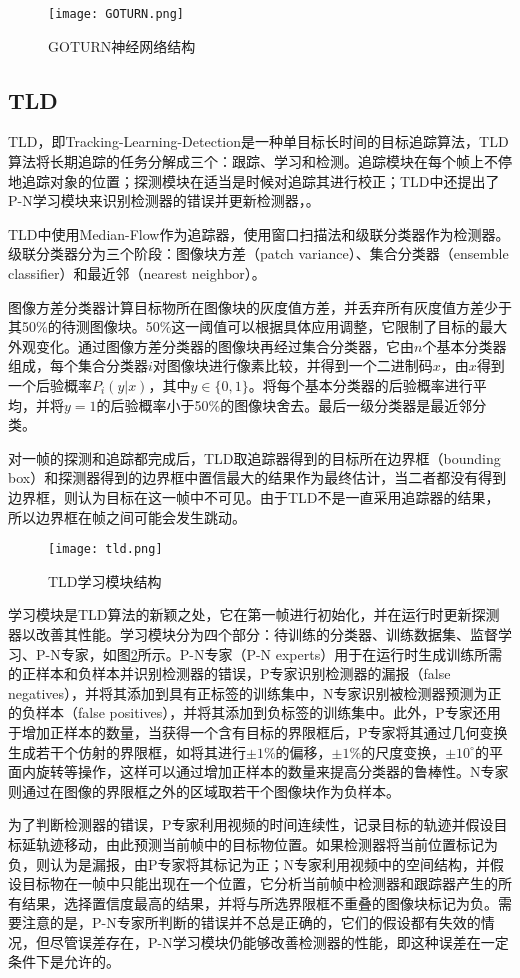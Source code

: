 \begin{figure}[htb]
  \centering
  \texttt{[image: GOTURN.png]}
  \caption{GOTURN神经网络结构}
  \label{fig:GOTURN}
\end{figure}

\subsection{TLD}

  TLD，即Tracking-Learning-Detection是一种单目标长时间的目标追踪算法，TLD算法将长期追踪的任务分解成三个：跟踪、学习和检测。追踪模块在每个帧上不停地追踪对象的位置；探测模块在适当是时候对追踪其进行校正；TLD中还提出了P-N学习模块来识别检测器的错误并更新检测器，\cite{kalal2012tracking}。

  TLD中使用Median-Flow作为追踪器，使用窗口扫描法和级联分类器作为检测器。级联分类器分为三个阶段：图像块方差（patch variance）、集合分类器（ensemble classifier）和最近邻（nearest neighbor）。

  图像方差分类器计算目标物所在图像块的灰度值方差，并丢弃所有灰度值方差少于其50\%的待测图像块。50\%这一阈值可以根据具体应用调整，它限制了目标的最大外观变化。通过图像方差分类器的图像块再经过集合分类器，它由$n$个基本分类器组成，每个集合分类器$i$对图像块进行像素比较，并得到一个二进制码$x$，由$x$得到一个后验概率$P_i(y|x)$，其中$y\in\{0,1\}$。将每个基本分类器的后验概率进行平均，并将$y=1$的后验概率小于50\%的图像块舍去。最后一级分类器是最近邻分类。

  对一帧的探测和追踪都完成后，TLD取追踪器得到的目标所在边界框（bounding box）和探测器得到的边界框中置信最大的结果作为最终估计，当二者都没有得到边界框，则认为目标在这一帧中不可见。由于TLD不是一直采用追踪器的结果，所以边界框在帧之间可能会发生跳动。

\begin{figure}[htb]
  \centering
  \texttt{[image: tld.png]}
  \caption{TLD学习模块结构}
  \label{fig:tldlearning}
\end{figure}

  学习模块是TLD算法的新颖之处，它在第一帧进行初始化，并在运行时更新探测器以改善其性能。学习模块分为四个部分：待训练的分类器、训练数据集、监督学习、P-N专家，如图\ref{fig:tldlearning}所示。P-N专家（P-N experts）用于在运行时生成训练所需的正样本和负样本并识别检测器的错误，P专家识别检测器的漏报（false negatives），并将其添加到具有正标签的训练集中，N专家识别被检测器预测为正的负样本（false positives），并将其添加到负标签的训练集中。此外，P专家还用于增加正样本的数量，当获得一个含有目标的界限框后，P专家将其通过几何变换生成若干个仿射的界限框，如将其进行$\pm 1\%$的偏移，$\pm 1\%$的尺度变换，$\pm 10^{\circ}$的平面内旋转等操作，这样可以通过增加正样本的数量来提高分类器的鲁棒性。N专家则通过在图像的界限框之外的区域取若干个图像块作为负样本。


  为了判断检测器的错误，P专家利用视频的时间连续性，记录目标的轨迹并假设目标延轨迹移动，由此预测当前帧中的目标物位置。如果检测器将当前位置标记为负，则认为是漏报，由P专家将其标记为正；N专家利用视频中的空间结构，并假设目标物在一帧中只能出现在一个位置，它分析当前帧中检测器和跟踪器产生的所有结果，选择置信度最高的结果，并将与所选界限框不重叠的图像块标记为负。需要注意的是，P-N专家所判断的错误并不总是正确的，它们的假设都有失效的情况，但尽管误差存在，P-N学习模块仍能够改善检测器的性能，即这种误差在一定条件下是允许的。
